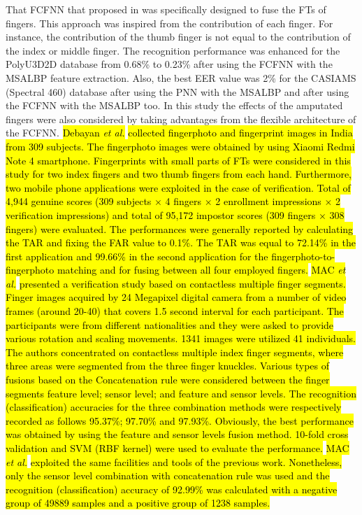 \documentclass[review]{elsarticle}
\begin{document}
	That FCFNN that proposed in \cite{Al-Nima2017finger} was specifically designed to fuse the FTs of fingers. This approach was inspired from the contribution of each finger. For instance, the contribution of the thumb finger is not equal to the contribution of the index or middle finger. The recognition performance was enhanced for the PolyU3D2D database from 0.68\% to 0.23\% after using the FCFNN with the MSALBP feature extraction. Also, the best EER value was 2\% for the CASIAMS (Spectral 460) database after using the PNN with the MSALBP and after using the FCFNN with the MSALBP too. In this study the effects of the amputated fingers were also considered by taking advantages from the flexible architecture of the FCFNN. \hl{Debayan \textit{et al.}} \cite{Debayan2018matching} \hl{collected fingerphoto and fingerprint images in India from 309 subjects. The fingerphoto images were obtained by using Xiaomi Redmi Note 4 smartphone. Fingerprints with small parts of FTs were considered in this study for two index fingers and two thumb fingers from each hand. Furthermore, two mobile phone applications were exploited in the case of verification. Total of 4,944 genuine scores (309
	subjects $\times$ 4 fingers $\times$ 2 enrollment impressions $\times$ 2 verification impressions) and total of 95,172 impostor scores (309 fingers $\times$ 308 fingers) were evaluated. The performances were generally reported by calculating the TAR and fixing the FAR value to 0.1\%. The TAR was equal to 72.14\% in the first application and 99.66\% in the second application for the fingerphoto-to-fingerphoto
	matching and for fusing between all four employed fingers.} \hl{MAC \textit{et al.}} \cite{MAC2018contactless} \hl{presented a verification study based on contactless multiple finger segments. Finger images acquired by 24 Megapixel digital camera from a number of video frames (around 20-40) that covers 1.5 second interval for each participant. The participants were from different nationalities and they were asked to provide various rotation and scaling movements. 1341 images were utilized 41 individuals. The authors concentrated on contactless multiple index finger segments, where three areas were segmented from the three finger knuckles. Various types of fusions based on the Concatenation rule were considered between the finger segments feature level; sensor level; and feature and sensor levels. The recognition (classification) accuracies for the three combination methods were respectively recorded as follows 95.37\%; 97.70\% and 97.93\%. Obviously, the best performance was obtained by using the feature and sensor levels fusion method. 10-fold cross validation and SVM (RBF kernel) were used to evaluate the performance.} \hl{MAC \textit{et al.}} \cite{Jahan2018Contactless} \hl{exploited the same facilities and tools of the previous work. Nonetheless, only the sensor level combination with concatenation rule was used and the recognition (classification) accuracy of  92.99\% was calculated with a negative group of 49889 samples and a positive group of 1238 samples.} 
\end{document}
